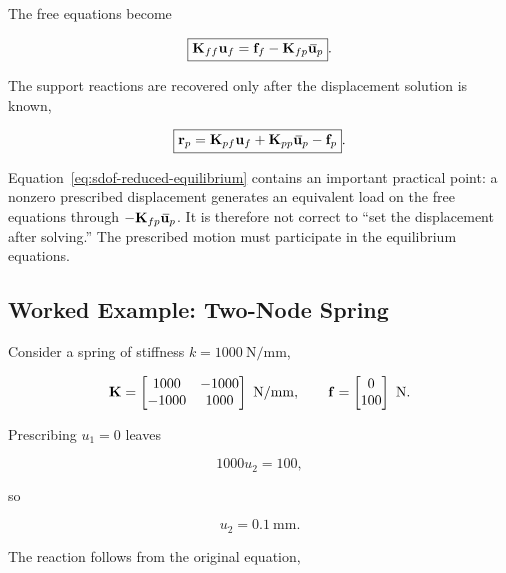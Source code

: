 The free equations become

\begin{equation}\label{eq:sdof-reduced-equilibrium}
    \boxed{
    \mathbf{K}_{ff}\mathbf{u}_f
    =
    \mathbf{f}_f-\mathbf{K}_{fp}{}\mkern3mu\overline{\mkern-3mu\mathbf{u}}_p
    }.
\end{equation}

The support reactions are recovered only after the displacement solution is
known,

\begin{equation}\label{eq:sdof-reaction}
    \boxed{
    \mathbf{r}_p
    =
    \mathbf{K}_{pf}\mathbf{u}_f
    +\mathbf{K}_{pp}{}\mkern3mu\overline{\mkern-3mu\mathbf{u}}_p
    -\mathbf{f}_p
    }.
\end{equation}

Equation~\eqref{eq:sdof-reduced-equilibrium} contains an important practical
point: a nonzero prescribed displacement generates an equivalent load on the
free equations through $-\mathbf{K}_{fp}{}\mkern3mu\overline{\mkern-3mu\mathbf{u}}_p$. It is therefore not
correct to ``set the displacement after solving.'' The prescribed motion must
participate in the equilibrium equations.

\subsection{Worked Example: Two-Node Spring}

Consider a spring of stiffness $k=1000~\mathrm{N/mm}$,

\begin{equation}
    \mathbf{K}
    =
    \begin{bmatrix}
        1000&-1000\\
        -1000&1000
    \end{bmatrix}\ \mathrm{N/mm},
    \qquad
    \mathbf{f}
    =
    \begin{bmatrix}
        0\\100
    \end{bmatrix}\ \mathrm{N}.
\end{equation}

Prescribing $u_1=0$ leaves

\begin{equation}
    1000u_2=100,
\end{equation}

so

\begin{equation}
    u_2=0.1~\mathrm{mm}.
\end{equation}

The reaction follows from the original equation,


